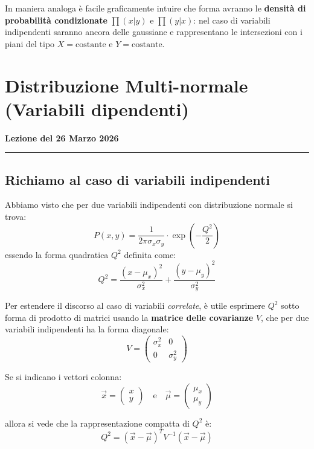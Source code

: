 \documentclass[openany,a4paper,12pt]{book}
\theoremstyle{remark}
\newcommand{\thelezione}{}
\newcommand{\lezione}[2]{
\newpage
\renewcommand{\thelezione}{#2} 
\section{#1} 
\noindent\textbf{\color{RoyalBlue}Lezione del #2}\par\vspace{0.5em}\hrule\vspace{1em}
}
\begin{document}
In maniera analoga è facile graficamente intuire che forma avranno le \textbf{densità di probabilità condizionate} $\prod(x|y)$ e $\prod(y|x)$: nel caso di variabili indipendenti saranno ancora delle gaussiane e rappresentano le intersezioni con i piani del tipo $X = \text{costante}$ e $Y = \text{costante}$.










\lezione{Distribuzione Multi-normale (Variabili dipendenti)}{26 Marzo 2026}
\subsection*{Richiamo al caso di variabili indipendenti}
Abbiamo visto che per due variabili indipendenti con distribuzione normale si trova:
\begin{equation}
P(x,y) = \frac{1}{2\pi\sigma_x\sigma_y} \cdot \exp\left(-\frac{Q^2}{2}\right)
\end{equation}
essendo la forma quadratica $Q^2$ definita come:
\begin{equation}
Q^2 = \frac{(x-\mu_x)^2}{\sigma_x^2} + \frac{(y-\mu_y)^2}{\sigma_y^2}
\end{equation}

Per estendere il discorso al caso di variabili \emph{correlate}, è utile esprimere $Q^2$ sotto forma di prodotto di matrici usando la \textbf{matrice delle covarianze} $V$, che per due variabili indipendenti ha la forma diagonale:
\begin{equation}
V = \begin{pmatrix}
\sigma_x^2 & 0 \\
0 & \sigma_y^2
\end{pmatrix}
\end{equation}

Se si indicano i vettori colonna:
\begin{equation*}
\vec{x} = \begin{pmatrix} x \\ y \end{pmatrix} \quad \text{e} \quad \vec{\mu} = \begin{pmatrix} \mu_x \\ \mu_y \end{pmatrix}
\end{equation*}

allora si vede che la rappresentazione compatta di $Q^2$ è:
\begin{equation}
Q^2 = (\vec{x} - \vec{\mu})^T V^{-1} (\vec{x} - \vec{\mu})
\end{equation}
\end{document}
